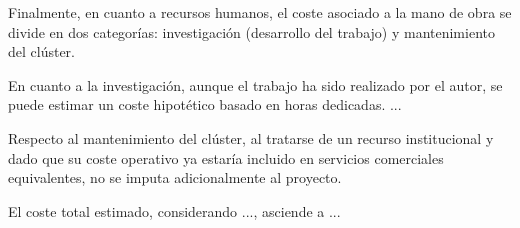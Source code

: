 Finalmente, en cuanto a recursos humanos, el coste asociado a la mano de obra se divide en dos categorías: investigación (desarrollo del trabajo) y mantenimiento del clúster.

En cuanto a la investigación, aunque el trabajo ha sido realizado por el autor, se puede estimar un coste hipotético basado en horas dedicadas. ...

Respecto al mantenimiento del clúster, al tratarse de un recurso institucional y dado que su coste operativo ya estaría incluido en servicios comerciales equivalentes, no se imputa adicionalmente al proyecto.

El coste total estimado, considerando ..., asciende a ...
